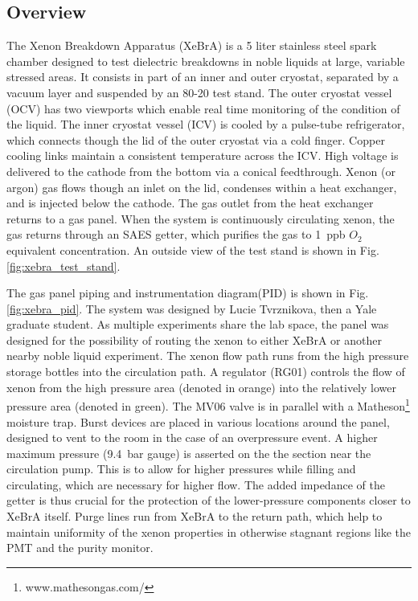 \subsection{Overview}
The Xenon Breakdown Apparatus (XeBrA) is a 5 liter stainless steel spark chamber designed to test dielectric breakdowns in noble liquids at large, variable stressed areas.
It consists in part of an inner and outer cryostat, separated by a vacuum layer and suspended by an 80-20 test stand.
The outer cryostat vessel (OCV) has two viewports which enable real time monitoring of the condition of the liquid.
The inner cryostat vessel (ICV) is cooled by a pulse-tube refrigerator, which connects though the lid of the outer cryostat via a cold finger.
Copper cooling links maintain a consistent temperature across the ICV.
High voltage is delivered to the cathode from the bottom via a conical feedthrough.
Xenon (or argon) gas flows though an inlet on the lid, condenses within a heat exchanger, and is injected below the cathode.
The gas outlet from the heat exchanger returns to a gas panel.
When the system is continuously circulating xenon, the gas returns through an SAES getter, which purifies the gas to 1~ppb $O_2$ equivalent concentration.
An outside view of the test stand is shown in Fig. \ref{fig:xebra_test_stand}.

The gas panel piping and instrumentation diagram(PID) is shown in Fig. \ref{fig:xebra_pid}.
The system was designed by Lucie Tvrznikova, then a Yale graduate student.
As multiple experiments share the lab space, the panel was designed for the possibility of routing the xenon to either XeBrA or another nearby noble liquid experiment.
The xenon flow path runs from the high pressure storage bottles into the circulation path.
A regulator (RG01) controls the flow of xenon from the high pressure area (denoted in orange) into the relatively lower pressure area (denoted in green).
The MV06 valve is in parallel with a Matheson\footnote{www.mathesongas.com/} moisture trap.
Burst devices are placed in various locations around the panel, designed to vent to the room in the case of an overpressure event.
A higher maximum pressure (9.4~bar gauge) is asserted on the the section near the circulation pump.
This is to allow for higher pressures while filling and circulating, which are necessary for higher flow.
The added impedance of the getter is thus crucial for the protection of the lower-pressure components closer to XeBrA itself.
Purge lines run from XeBrA to the return path, which help to maintain uniformity of the xenon properties in otherwise stagnant regions like the PMT and the purity monitor.

